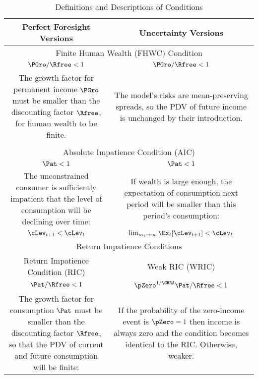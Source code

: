 \begin{table}[!th]
\caption{Definitions and Descriptions of Conditions} \label{table:Comparison}\center
\begin{tabular}{|c|c|}\hline
Perfect Foresight Versions & Uncertainty Versions\\ \hline
\multicolumn{2}{|c|}{Finite Human Wealth (FHWC) Condition} \\ \hline
$\PGro/\Rfree < 1$                                                          & $\PGro/\Rfree < 1$ \\
\multirow{3}{75mm}{The growth factor for permanent income $\PGro$ must be smaller than the discounting factor $\Rfree$, for human wealth to be finite.} & 
\multirow{3}{75mm}{The model's risks are mean-preserving spreads, so the PDV of future income is unchanged by their introduction.} \\
& \\ 
& \\ 
& \\ \hline
\multicolumn{2}{|c|}{Absolute Impatience Condition (AIC)} \\ \hline
$\Pat < 1$                                        &  $\Pat < 1$ \\ 
\multirow{3}{75mm}{The unconstrained consumer is sufficiently impatient that the level of consumption will be declining over time:} &
\multirow{3}{75mm}{If wealth is large enough, the expectation of consumption next period will be smaller than this period's consumption:} \\
& \\
& \\
$\cLev_{t+1} < \cLev_{t}$ & $\lim_{m_{t} \rightarrow \infty} \Ex_{t} [\cLev_{t+1}] < \cLev_{t}$ \\ 
\hline
\multicolumn{2}{|c|}{Return Impatience Conditions} \\ \hline
\multicolumn{1}{|c|}{Return Impatience Condition (RIC)} & \multicolumn{1}{c|}{Weak RIC (WRIC)} \\ \hline
$\Pat/\Rfree < 1$                                          & $\pZero^{1/\CRRA}\Pat/\Rfree < 1$ \\
\multirow{3}{75mm}{The growth factor for consumption $\Pat$ must be smaller than the discounting factor $\Rfree$, so that the PDV of current and future consumption will be finite:}  &
\multirow{3}{75mm}{If the probability of the zero-income event is $\pZero=1$ then income is always zero and the condition becomes identical to the RIC.  Otherwise, weaker.} \\            
& \\

\end{tabular}
\end{table}
